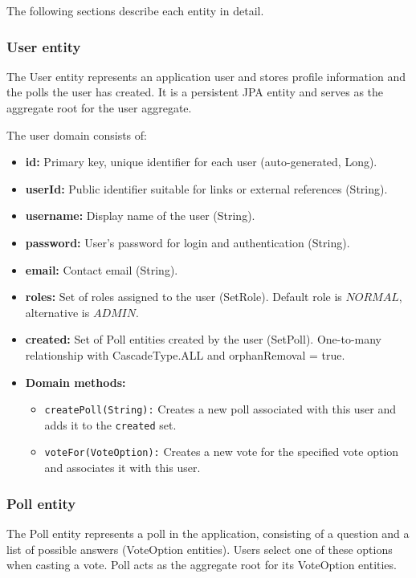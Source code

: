 The following sections describe each entity in detail.

\subsubsection{User entity}


The User entity represents an application user and stores profile information and the polls the user has created. It is a persistent JPA entity and serves as the aggregate root for the user aggregate.


The user domain consists of:

\begin{itemize}
    \item \textbf{id:} Primary key, unique identifier for each user (auto-generated, Long).
    \item \textbf{userId:} Public identifier suitable for links or external references (String).
    \item \textbf{username:} Display name of the user (String).
    \item \textbf{password:} User's password for login and authentication (String).
    \item \textbf{email:} Contact email (String).
    \item \textbf{roles:} Set of roles assigned to the user (Set\<Role\>). Default role is $NORMAL$, alternative is $ADMIN$.
    \item \textbf{created:} Set of Poll entities created by the user (Set\<Poll\>). One-to-many relationship with CascadeType.ALL and orphanRemoval = true.
    \item \textbf{Domain methods:} 
        \begin{itemize}
            \item \texttt{createPoll(String):} Creates a new poll associated with this user and adds it to the \texttt{created} set.
            \item \texttt{voteFor(VoteOption):} Creates a new vote for the specified vote option and associates it with this user.
        \end{itemize}
\end{itemize}

\subsubsection{Poll entity}

The Poll entity represents a poll in the application, consisting of a question and a list of possible answers (VoteOption entities). Users select one of these options when casting a vote. Poll acts as the aggregate root for its VoteOption entities.



